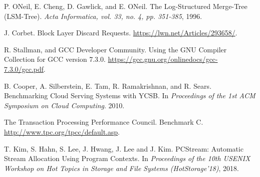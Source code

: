 \begin{thebibliography}{00}
P. ONeil, E. Cheng, D. Gawlick, and E. ONeil.
The Log-Structured Merge-Tree (LSM-Tree).
\textit{Acta Informatica, vol. 33, no. 4, pp. 351-385}, 1996.

J. Corbet.
Block Layer Discard Requests.
\url{https://lwn.net/Articles/293658/}.

R. Stallman, and GCC Developer Community.
Using the GNU Compiler Collection for GCC version 7.3.0.
\url{https://gcc.gnu.org/onlinedocs/gcc-7.3.0/gcc.pdf}.

B. Cooper, A. Silberstein, E. Tam, R. Ramakrishnan, and R. Sears.
Benchmarking Cloud Serving Systems with YCSB.
In \textit{Proceedings of the 1st ACM Symposium on Cloud Computing}. 2010.

The Transaction Processing Performance Council.
Benchmark C.
\url{http://www.tpc.org/tpcc/default.asp}. 

T. Kim, S. Hahn, S. Lee, J. Hwang, J. Lee and J. Kim.
PCStream: Automatic Stream Allocation Using Program Contexts.
In \textit{Proceedings of the 10th USENIX Workshop on Hot Topics in Storage
and File Systems (HotStorage'18)}, 2018.


\end{thebibliography}
